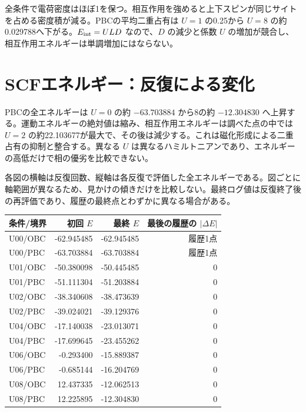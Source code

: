 \documentclass[a4paper,10pt,oneside,openany]{ltjsreport}
\newcommand{\sourcefile}[1]{{\small\texttt{\detokenize{#1}}}}
\begin{document}
全条件で電荷密度はほぼ1を保つ。相互作用を強めると上下スピンが同じサイトを占める密度積が減る。PBCの平均二重占有は $U=1$ の0.25から $U=8$ の約0.029788へ下がる。$E_{\rm int}=ULD$ なので、$D$ の減少と係数 $U$ の増加が競合し、相互作用エネルギーは単調増加にはならない。

\chapter{SCFエネルギー：反復による変化}

\sourcefile{scf_energy.png}

PBCの全エネルギーは $U=0$ の約 $-63.703884$ から8の約 $-12.304830$ へ上昇する。運動エネルギーの絶対値は縮み、相互作用エネルギーは調べた点の中では $U=2$ の約22.103677が最大で、その後は減少する。これは磁化形成による二重占有の抑制と整合する。異なる $U$ は異なるハミルトニアンであり、エネルギーの高低だけで相の優劣を比較できない。

各図の横軸は反復回数、縦軸は各反復で評価した全エネルギーである。図ごとに軸範囲が異なるため、見かけの傾きだけを比較しない。最終ログ値は反復終了後の再評価であり、履歴の最終点とわずかに異なる場合がある。

\begin{center}\small\setlength{\tabcolsep}{4pt}
\begin{longtable}{lrrr}
\toprule
条件/境界 & 初回 $E$ & 最終 $E$ & 最後の履歴の $|\Delta E|$ \\ \midrule
\endhead
U00/OBC & -62.945485 & -62.945485 & 履歴1点 \\
U00/PBC & -63.703884 & -63.703884 & 履歴1点 \\
U01/OBC & -50.380098 & -50.445485 & $0$ \\
U01/PBC & -51.111304 & -51.203884 & $0$ \\
U02/OBC & -38.340608 & -38.473639 & $0$ \\
U02/PBC & -39.024021 & -39.129376 & $0$ \\
U04/OBC & -17.140038 & -23.013071 & $0$ \\
U04/PBC & -17.699645 & -23.455262 & $0$ \\
U06/OBC & -0.293400 & -15.889387 & $0$ \\
U06/PBC & -0.685144 & -16.204769 & $0$ \\
U08/OBC & 12.437335 & -12.062513 & $0$ \\
U08/PBC & 12.225895 & -12.304830 & $0$ \\
\bottomrule\end{longtable}\end{center}
\end{document}
